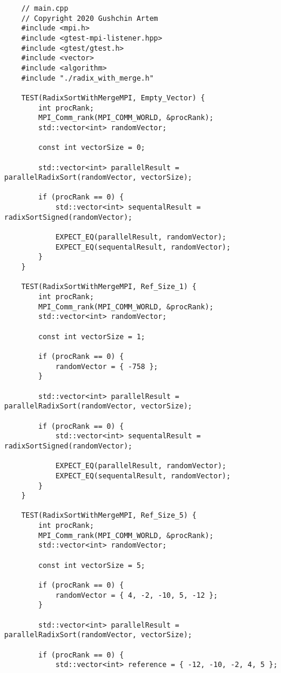 \documentclass{report}
\begin{document}
\begin{lstlisting}
    // main.cpp
    // Copyright 2020 Gushchin Artem
    #include <mpi.h>
    #include <gtest-mpi-listener.hpp>
    #include <gtest/gtest.h>
    #include <vector>
    #include <algorithm>
    #include "./radix_with_merge.h"
    
    TEST(RadixSortWithMergeMPI, Empty_Vector) {
        int procRank;
        MPI_Comm_rank(MPI_COMM_WORLD, &procRank);
        std::vector<int> randomVector;
    
        const int vectorSize = 0;
    
        std::vector<int> parallelResult = parallelRadixSort(randomVector, vectorSize);
    
        if (procRank == 0) {
            std::vector<int> sequentalResult = radixSortSigned(randomVector);
    
            EXPECT_EQ(parallelResult, randomVector);
            EXPECT_EQ(sequentalResult, randomVector);
        }
    }
    
    TEST(RadixSortWithMergeMPI, Ref_Size_1) {
        int procRank;
        MPI_Comm_rank(MPI_COMM_WORLD, &procRank);
        std::vector<int> randomVector;
    
        const int vectorSize = 1;
    
        if (procRank == 0) {
            randomVector = { -758 };
        }
    
        std::vector<int> parallelResult = parallelRadixSort(randomVector, vectorSize);
    
        if (procRank == 0) {
            std::vector<int> sequentalResult = radixSortSigned(randomVector);
    
            EXPECT_EQ(parallelResult, randomVector);
            EXPECT_EQ(sequentalResult, randomVector);
        }
    }
    
    TEST(RadixSortWithMergeMPI, Ref_Size_5) {
        int procRank;
        MPI_Comm_rank(MPI_COMM_WORLD, &procRank);
        std::vector<int> randomVector;
    
        const int vectorSize = 5;
    
        if (procRank == 0) {
            randomVector = { 4, -2, -10, 5, -12 };
        }
    
        std::vector<int> parallelResult = parallelRadixSort(randomVector, vectorSize);
    
        if (procRank == 0) {
            std::vector<int> reference = { -12, -10, -2, 4, 5 };
    

\end{lstlisting}
\end{document}
